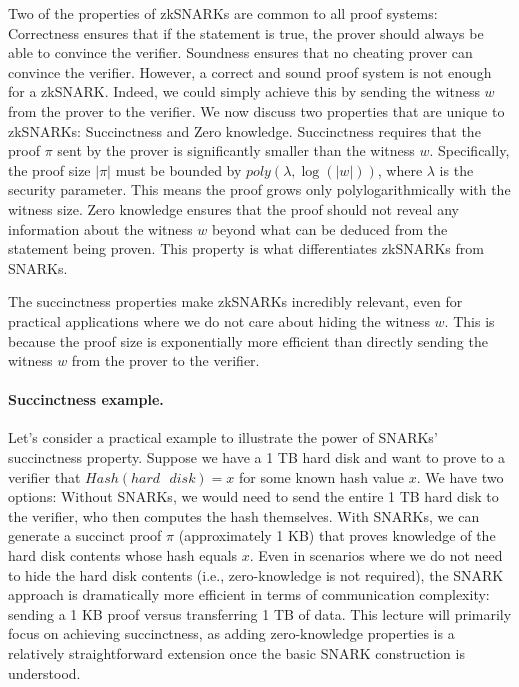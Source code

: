 Two of the properties of zkSNARKs are common to all proof systems: Correctness ensures that if the statement is true, the prover should always be able to convince the verifier. Soundness ensures that no cheating prover can convince the verifier. However, a correct and sound proof system is not enough for a zkSNARK. Indeed, we could simply achieve this by sending the witness $w$ from the prover to the verifier. We now discuss two properties that are unique to zkSNARKs: Succinctness and Zero knowledge. Succinctness requires that the proof $\pi$ sent by the prover is significantly smaller than the witness $w$. Specifically, the proof size $|\pi|$ must be bounded by $poly(\lambda, \log(|w|))$, where $\lambda$ is the security parameter. This means the proof grows only polylogarithmically with the witness size. Zero knowledge ensures that the proof should not reveal any information about the witness $w$ beyond what can be deduced from the statement being proven. This property is what differentiates zkSNARKs from SNARKs.

The succinctness properties make zkSNARKs incredibly relevant, even for practical applications where we do not care about hiding the witness $w$. This is because the proof size is exponentially more efficient than directly sending the witness $w$ from the prover to the verifier.

\paragraph{Succinctness example.} Let's consider a practical example to illustrate the power of SNARKs' succinctness property. Suppose we have a 1 TB hard disk and want to prove to a verifier that $Hash(hard\text{ }disk) = x$ for some known hash value $x$. We have two options: Without SNARKs, we would need to send the entire 1 TB hard disk to the verifier, who then computes the hash themselves. With SNARKs, we can generate a succinct proof $\pi$ (approximately 1 KB) that proves knowledge of the hard disk contents whose hash equals $x$. Even in scenarios where we do not need to hide the hard disk contents (i.e., zero-knowledge is not required), the SNARK approach is dramatically more efficient in terms of communication complexity: sending a 1 KB proof versus transferring 1 TB of data. This lecture will primarily focus on achieving succinctness, as adding zero-knowledge properties is a relatively straightforward extension once the basic SNARK construction is understood.

